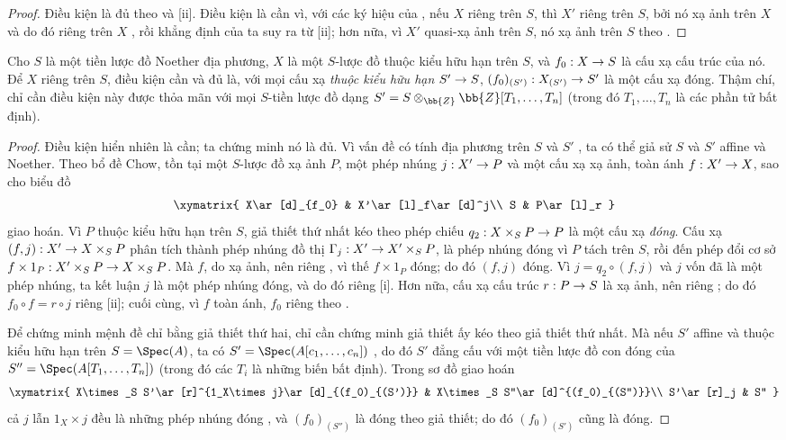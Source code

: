 \documentclass[oneside,10pt]{amsart}
\makeatletter
\newcommand{\ega@arrow}[2]{\mathchoice{#1}{#2}{#2}{#2}}
\renewcommand{\to}{\ega@arrow{\longrightarrow}{\rightarrow}}
\newcommand{\oldpage}[2][]{\marginnote{\normalfont\footnotesize\textbf{#1}~|~#2}\ignorespaces}
\let\EGAOriginalLabel\label
\renewcommand{\label}[1]{\phantomsection\EGAOriginalLabel{#1}}
\makeatother
\begin{document}
\begin{proof}
Điều kiện là đủ theo  và [ii].
Điều kiện là cần vì, với các ký hiệu của , nếu $X$ riêng trên $S$, thì $X'$ riêng trên $S$, bởi nó xạ ảnh trên $X$ và do đó riêng trên $X$ , rồi khẳng định của ta suy ra từ [ii]; hơn nữa, vì $X'$ quasi-xạ ảnh trên $S$, nó xạ ảnh trên $S$ theo .
\end{proof}

\begin{corollary}[5.6.3]
\label{II.5.6.3}
Cho $S$ là một tiền lược đồ Noether địa phương, $X$ là một $S$-lược đồ thuộc kiểu hữu hạn trên $S$, và $f_0:X\to S$ là cấu xạ cấu trúc của nó.
Để $X$ riêng trên $S$, điều kiện cần và đủ là, với mọi cấu xạ \emph{thuộc kiểu hữu hạn} $S'\to S$, $(f_0)_{(S')}:X_{(S')}\to S'$ là một cấu xạ đóng.
Thậm chí, chỉ cần điều kiện này được thỏa mãn với mọi $S$-tiền lược đồ dạng $S'=S\otimes_\bb{Z}\bb{Z}[T_1,\ldots,T_n]$ (trong đó $T_1,\ldots,T_n$ là các phần tử bất định).
\end{corollary}

\begin{proof}
Điều kiện hiển nhiên là cần; ta chứng minh nó là đủ.
Vì vấn đề có tính địa phương trên $S$ và $S'$ , ta có thể giả sử $S$ và $S'$ affine và Noether.
Theo bổ đề Chow, tồn tại một $S$-lược đồ xạ ảnh $P$, một phép nhúng $j:X'\to P$ và một cấu xạ xạ ảnh, toàn ánh $f:X'\to X$, sao cho biểu đồ
\[
  \xymatrix{
    X\ar[d]_{f_0} &
    X'\ar[l]_f\ar[d]^j\\
    S &
    P\ar[l]_r
  }
\]
giao hoán.
Vì $P$ thuộc kiểu hữu hạn trên $S$, giả thiết thứ nhất kéo theo phép chiếu $q_2:X\times_S P\to P$ là một cấu xạ \emph{đóng}.
Cấu xạ $(f,j):X'\to X\times_S P$ phân tích thành phép nhúng đồ thị $\Gamma_j:X'\to X'\times_S P$, là phép nhúng đóng vì $P$ tách trên $S$, rồi đến phép đổi cơ sở $f\times1_P:X'\times_S P\to X\times_S P$.
Mà $f$, do xạ ảnh, nên riêng , vì thế $f\times1_P$ đóng; do đó $(f,j)$ đóng.
Vì $j=q_2\circ(f,j)$ và $j$ vốn đã là một phép nhúng, ta kết luận $j$ là một phép nhúng đóng, và do đó riêng [i].
Hơn nữa, cấu xạ cấu trúc $r:P\to S$ là xạ ảnh, nên riêng ; do đó $f_0\circ f=r\circ j$ riêng [ii]; cuối cùng, vì $f$ toàn ánh, $f_0$ riêng theo .

Để chứng minh mệnh đề chỉ bằng giả thiết thứ hai, chỉ cần chứng minh giả thiết ấy kéo theo giả thiết thứ nhất.
Mà nếu $S'$ affine và thuộc kiểu hữu hạn trên $S=\Spec(A)$,
\oldpage[II]{110}
ta có $S'=\Spec(A[c_1,\ldots,c_n])$ , do đó $S'$ đẳng cấu với một tiền lược đồ con đóng của $S''=\Spec(A[T_1,\ldots,T_n])$ (trong đó các $T_i$ là những biến bất định).
Trong sơ đồ giao hoán
\[
  \xymatrix{
    X\times_S S'\ar[r]^{1_X\times j}\ar[d]_{(f_0)_{(S')}} &
    X\times_S S''\ar[d]^{(f_0)_{(S'')}}\\
    S'\ar[r]_j &
    S''
  }
\]
cả $j$ lẫn $1_X\times j$ đều là những phép nhúng đóng , và $(f_0)_{(S'')}$ là đóng theo giả thiết;
do đó $(f_0)_{(S')}$ cũng là đóng.
\end{proof}
\end{document}
